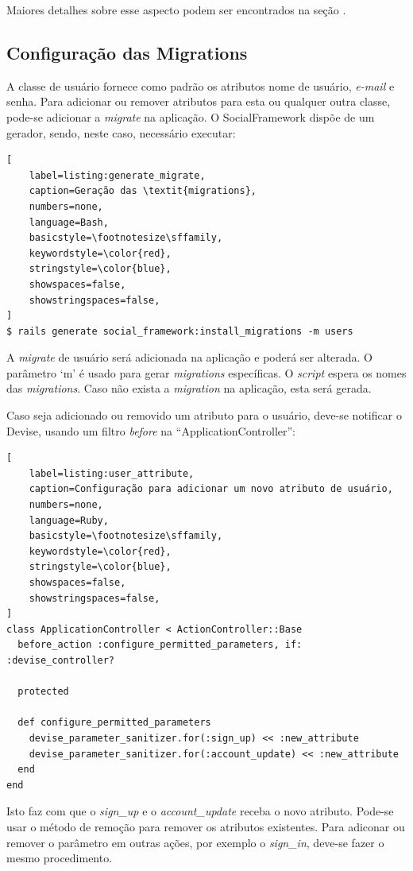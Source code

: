 Maiores detalhes sobre esse aspecto podem ser encontrados na seção .

\subsection{Configuração das Migrations}
\label{configuracao_das_migrations}

A classe de usuário fornece como padrão os atributos nome de usuário, \textit{e-mail} e senha. Para adicionar ou remover atributos para esta ou qualquer outra classe, pode-se adicionar a \textit{migrate} na aplicação. O SocialFramework dispõe de um gerador, sendo, neste caso, necessário executar:

\begin{lstlisting}[
    label=listing:generate_migrate,
    caption=Geração das \textit{migrations},
    numbers=none,
    language=Bash,
    basicstyle=\footnotesize\sffamily,
    keywordstyle=\color{red},
    stringstyle=\color{blue},
    showspaces=false,
    showstringspaces=false,
]
$ rails generate social_framework:install_migrations -m users
\end{lstlisting}

A \textit{migrate} de usuário será adicionada na aplicação e poderá ser alterada. O parâmetro `m' é usado para gerar \textit{migrations} específicas. O \textit{script} espera os nomes das \textit{migrations}. Caso não exista a \textit{migration} na aplicação, esta será gerada.

Caso seja adicionado ou removido um atributo para o usuário, deve-se notificar o Devise, usando um filtro \textit{before} na ``ApplicationController'':

\begin{lstlisting}[
    label=listing:user_attribute,
    caption=Configuração para adicionar um novo atributo de usuário,
    numbers=none,
    language=Ruby,
    basicstyle=\footnotesize\sffamily,
    keywordstyle=\color{red},
    stringstyle=\color{blue},
    showspaces=false,
    showstringspaces=false,
]
class ApplicationController < ActionController::Base
  before_action :configure_permitted_parameters, if: :devise_controller?

  protected

  def configure_permitted_parameters
    devise_parameter_sanitizer.for(:sign_up) << :new_attribute
    devise_parameter_sanitizer.for(:account_update) << :new_attribute
  end
end
\end{lstlisting}

Isto faz com que o \textit{sign\_up} e o \textit{account\_update} receba o novo atributo. Pode-se usar o método de remoção para remover os atributos existentes. Para adiconar ou remover o parâmetro em outras ações, por exemplo o \textit{sign\_in}, deve-se fazer o mesmo procedimento.

